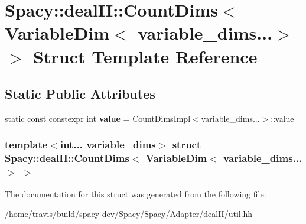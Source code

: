 \hypertarget{structSpacy_1_1dealII_1_1CountDims_3_01VariableDim_3_01variable__dims_8_8_8_4_01_4}{\section{\-Spacy\-:\-:deal\-I\-I\-:\-:\-Count\-Dims$<$ \-Variable\-Dim$<$ variable\-\_\-dims...$>$ $>$ \-Struct \-Template \-Reference}
\label{structSpacy_1_1dealII_1_1CountDims_3_01VariableDim_3_01variable__dims_8_8_8_4_01_4}
}
\subsection*{\-Static \-Public \-Attributes}
\begin{DoxyCompactItemize}
\item 
\hypertarget{structSpacy_1_1dealII_1_1CountDims_3_01VariableDim_3_01variable__dims_8_8_8_4_01_4_a6a6daaf3ed31647cc5ed6dae709a77e0}{static const constexpr int {\bfseries value} = \-Count\-Dims\-Impl$<$variable\-\_\-dims...$>$\-::value}\label{structSpacy_1_1dealII_1_1CountDims_3_01VariableDim_3_01variable__dims_8_8_8_4_01_4_a6a6daaf3ed31647cc5ed6dae709a77e0}

\end{DoxyCompactItemize}
\subsubsection*{template$<$int... variable\-\_\-dims$>$ struct Spacy\-::deal\-I\-I\-::\-Count\-Dims$<$ Variable\-Dim$<$ variable\-\_\-dims...$>$ $>$}



\-The documentation for this struct was generated from the following file\-:\begin{DoxyCompactItemize}
\item 
/home/travis/build/spacy-\/dev/\-Spacy/\-Spacy/\-Adapter/deal\-I\-I/util.\-hh\end{DoxyCompactItemize}
